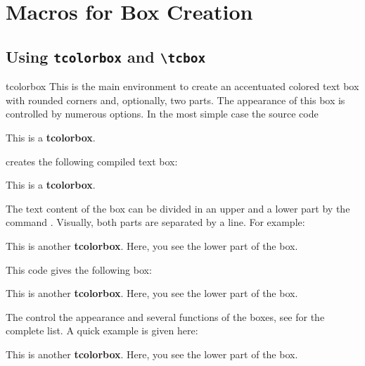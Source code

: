 \clearpage
\section{Macros for Box Creation}%
%
\subsection{Using \texttt{tcolorbox} and \texttt{\textbackslash tcbox}}\label{subsec:macros_using}
\begin{docEnvironment}{tcolorbox}{}
  This is the main environment to create an accentuated colored text box with
  rounded corners and, optionally, two parts. The appearance of this box
  is controlled by numerous options.
  In the most simple case the source code

\begin{dispListing}
\begin{tcolorbox}
This is a \textbf{tcolorbox}.
\end{tcolorbox}
\end{dispListing}

creates the following compiled text box:
\begin{tcolorbox}
This is a \textbf{tcolorbox}.
\end{tcolorbox}

The text content of the box can be divided
in an upper and a lower part
by the command . Visually, both parts are separated by a line.
For example:

\begin{dispListing}
\begin{tcolorbox}
This is another \textbf{tcolorbox}.
\tcblower
Here, you see the lower part of the box.
\end{tcolorbox}
\end{dispListing}

This code gives the following box:
\begin{tcolorbox}
This is another \textbf{tcolorbox}.
\tcblower
Here, you see the lower part of the box.
\end{tcolorbox}

The  control the appearance and several functions of the boxes,
see  for the complete list.
A quick example is given here:

\begin{dispExample}
\begin{tcolorbox}[colback=red!5!white,colframe=red!75!black,title=My nice heading]
This is another \textbf{tcolorbox}.
\tcblower
Here, you see the lower part of the box.
\end{tcolorbox}
\end{dispExample}
\end{docEnvironment}


